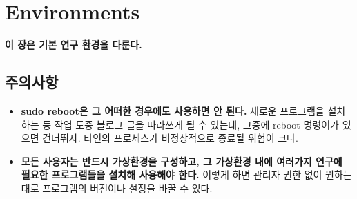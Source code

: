 
\graphicspath{{./chap4/images/}}  
\chapter{Environments}

\textbf{이 장은 기본 연구 환경을 다룬다.}
\section{주의사항}
\begin{itemize}
 \item \textbf{sudo reboot은 그 어떠한 경우에도 사용하면 안 된다.} 새로운 프로그램을 설치하는 등 작업 도중 블로그 글을 따라쓰게 될 수 있는데, 그중에 reboot 명령어가 있으면 건너뛰자. 타인의 프로세스가 비정상적으로 종료될 위험이 크다.
 \item \textbf{모든 사용자는 반드시 가상환경을 구성하고, 그 가상환경 내에 여러가지 연구에 필요한 프로그램들을 설치해 사용해야 한다.} 이렇게 하면 관리자 권한 없이 원하는 대로 프로그램의 버전이나 설정을 바꿀 수 있다.
\end{itemize}

